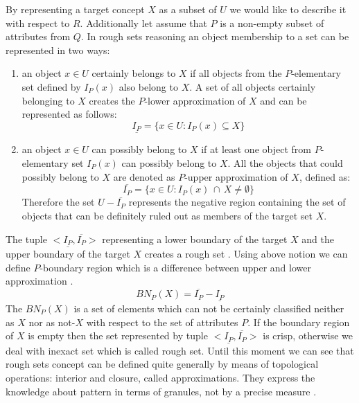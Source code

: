 By representing a target concept $X$ as a subset of $U$ we would like to
describe it with respect to $R$. Additionally let assume that $P$ is a non-empty
subset of attributes from $Q$. In rough sets reasoning an object membership to a
set can be represented in two ways:
\begin{enumerate}
    \item an object $ x \in U$ certainly belongs to $X$ if
        all objects from the $P$-elementary set defined by $I_P(x)$ also belong to $X$.
        A set of all objects certainly belonging to $X$ creates the $P$-lower
        approximation of $X$ and can be represented as follows:
        \begin{equation}
            \underline{I_P} = \{ x \in U: I_P(x) \subseteq X\}
            \label{eq:lower_approximation}
        \end{equation}
    \item an object $x \in U$ can possibly belong to $X$ if at least one object
        from $P$-elementary set $I_P(x)$ can possibly belong to $X$. All the
        objects that could possibly belong to $X$ are denoted as $P$-upper
        approximation of $X$, defined as:
        \begin{equation}
            \overline{I_P} = \{x\in U: I_P(x) \, \cap \, X \neq \emptyset \}
            \label{eq:upper_approximation}
        \end{equation}
        Therefore the set $U - \overline{I_P}$ represents the negative region
        containing the set of objects that can be definitely ruled out as
        members of the target set $X$.
\end{enumerate}

The tuple $<\underline{I_P}, \overline{I_P}>$ representing a lower boundary of
the target $X$ and the upper boundary of the target $X$ creates a rough set \cite{bib34}.
Using above notion we can define $P$-boundary region which is a difference
between upper and lower approximation \cite{bib14}. 
\begin{equation}
    BN_P(X) = \overline{I_P} - \underline{I_P}
    \label{eq:boundary_region}
\end{equation}
The $BN_P(X)$ is a set of elements which can not be certainly classified neither
as $X$ nor as not-$X$ with respect to the set of attributes $P$. If the
boundary region of $X$ is empty then the set represented by tuple
$<\underline{I_P}, \overline{I_P}>$ 
is crisp, otherwise we deal with inexact set which is called rough set. 
Until this moment we can see that rough sets concept can be defined quite generally by means of topological
operations: interior and closure, called approximations. They express the
knowledge about pattern in terms of granules, not by a precise measure
\cite{bib40}.

